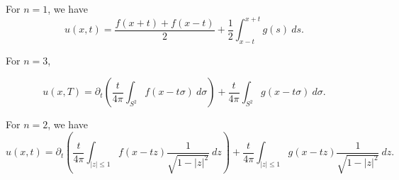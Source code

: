 For $n = 1$, we have 
\begin{equation*}
    u(x,t) = \frac{f(x + t) + f(x - t)}{2} + \frac{1}{2}\int_{x - t}^{x + t}g(s)~ds.
\end{equation*}

For $n = 3$, 

\begin{equation*}
    u(x,T) = \partial_t\left(\frac{t}{4\pi}\int_{S^2}f(x - t\sigma)~d\sigma\right) + \frac{t}{4\pi}\int_{S^2}g(x - t\sigma)~d\sigma.
\end{equation*}

For $n = 2$, we have 
\begin{equation*}
    u(x, t) = \partial_t\left(\frac{t}{4\pi}\int_{|z|\le 1} f(x - tz)\frac{1}{\sqrt{1 - |z|^2}}~dz\right) + \frac{t}{4\pi}\int_{|z|\le 1}g(x - tz)\frac{1}{\sqrt{1 - |z|^2}}~dz.
\end{equation*}